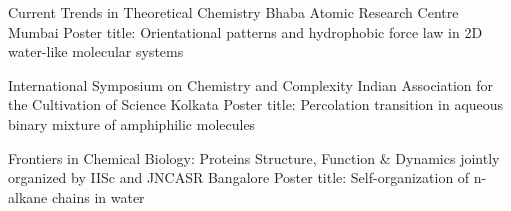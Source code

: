\vspace{0.5em}
        {Current Trends in Theoretical Chemistry}
        {}
        {Bhaba Atomic Research Centre}
        {Mumbai}
        {Poster title: Orientational patterns and hydrophobic force law in 2D water-like molecular systems}

\vspace{0.5em}
        {International Symposium on Chemistry and Complexity}
        {}
        {Indian Association for the Cultivation of Science}
        {Kolkata}
        {Poster title: Percolation transition in aqueous binary mixture of amphiphilic molecules}

\vspace{0.5em}
        {Frontiers in Chemical Biology: Proteins Structure, Function \& Dynamics}
        {}
        {jointly organized by IISc and JNCASR}
        {Bangalore}
        {Poster title: Self-organization of n-alkane chains in water}

%


